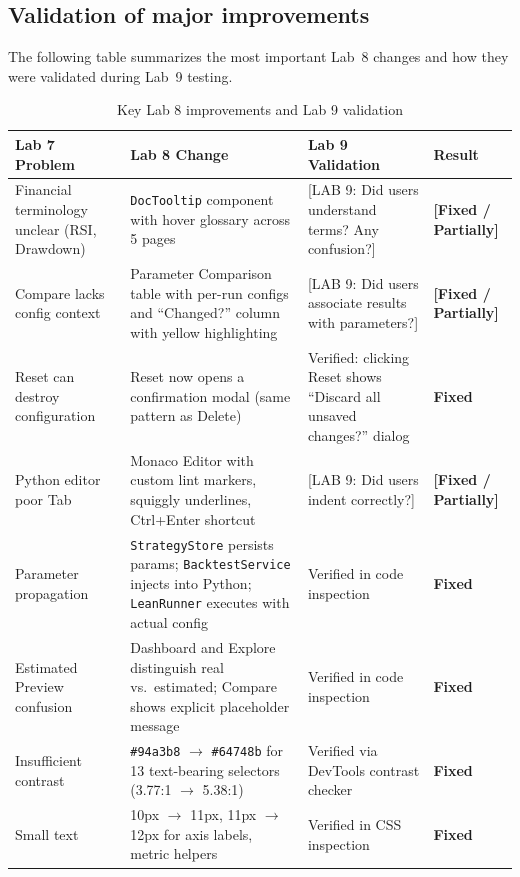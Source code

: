 \documentclass[10pt,a4paper]{article}
\begin{document}
\subsection{Validation of major improvements}

The following table summarizes the most important Lab~8 changes and how they were validated during Lab~9 testing.

\begin{table}[H]
\centering
\caption{Key Lab 8 improvements and Lab 9 validation}
\label{tab:improvements}
\small
\begin{tabularx}{\textwidth}{L{2.8cm} L{3.2cm} X l}
\toprule
\textbf{Lab 7 Problem} & \textbf{Lab 8 Change} & \textbf{Lab 9 Validation} & \textbf{Result} \\
\midrule
Financial terminology unclear (RSI, Drawdown) &
  \texttt{DocTooltip} component with hover glossary across 5 pages &
  [LAB 9: Did users understand terms? Any confusion?] &
  \textbf{[Fixed / Partially]} \\[4pt]
Compare lacks config context &
  Parameter Comparison table with per-run configs and ``Changed?'' column with yellow highlighting &
  [LAB 9: Did users associate results with parameters?] &
  \textbf{[Fixed / Partially]} \\[4pt]
Reset can destroy configuration &
  Reset now opens a confirmation modal (same pattern as Delete) &
  Verified: clicking Reset shows ``Discard all unsaved changes?'' dialog &
  \textbf{Fixed} \\[4pt]
Python editor poor Tab &
  Monaco Editor with custom lint markers, squiggly underlines, Ctrl+Enter shortcut &
  [LAB 9: Did users indent correctly?] &
  \textbf{[Fixed / Partially]} \\[4pt]
Parameter propagation &
  \texttt{StrategyStore} persists params; \texttt{BacktestService} injects into Python; \texttt{LeanRunner} executes with actual config &
  Verified in code inspection &
  \textbf{Fixed} \\[4pt]
Estimated Preview confusion &
  Dashboard and Explore distinguish real vs.\ estimated; Compare shows explicit placeholder message &
  Verified in code inspection &
  \textbf{Fixed} \\[4pt]
Insufficient contrast &
  \texttt{\#94a3b8} $\to$ \texttt{\#64748b} for 13 text-bearing selectors (3.77:1 $\to$ 5.38:1) &
  Verified via DevTools contrast checker &
  \textbf{Fixed} \\[4pt]
Small text &
  10px $\to$ 11px, 11px $\to$ 12px for axis labels, metric helpers &
  Verified in CSS inspection &
  \textbf{Fixed} \\
\bottomrule
\end{tabularx}
\end{table}
\end{document}

